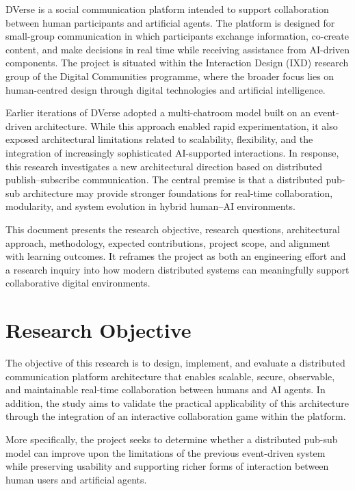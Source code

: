 \documentclass[11pt]{article}
\begin{document}
DVerse is a social communication platform intended to support collaboration between human participants and artificial agents. The platform is designed for small-group communication in which participants exchange information, co-create content, and make decisions in real time while receiving assistance from AI-driven components. The project is situated within the Interaction Design (IXD) research group of the Digital Communities programme, where the broader focus lies on human-centred design through digital technologies and artificial intelligence.

Earlier iterations of DVerse adopted a multi-chatroom model built on an event-driven architecture. While this approach enabled rapid experimentation, it also exposed architectural limitations related to scalability, flexibility, and the integration of increasingly sophisticated AI-supported interactions. In response, this research investigates a new architectural direction based on distributed publish--subscribe communication. The central premise is that a distributed pub-sub architecture may provide stronger foundations for real-time collaboration, modularity, and system evolution in hybrid human--AI environments.

This document presents the research objective, research questions, architectural approach, methodology, expected contributions, project scope, and alignment with learning outcomes. It reframes the project as both an engineering effort and a research inquiry into how modern distributed systems can meaningfully support collaborative digital environments.

\section{Research Objective}

The objective of this research is to design, implement, and evaluate a distributed communication platform architecture that enables scalable, secure, observable, and maintainable real-time collaboration between humans and AI agents. In addition, the study aims to validate the practical applicability of this architecture through the integration of an interactive collaboration game within the platform.

More specifically, the project seeks to determine whether a distributed pub-sub model can improve upon the limitations of the previous event-driven system while preserving usability and supporting richer forms of interaction between human users and artificial agents.
\end{document}
